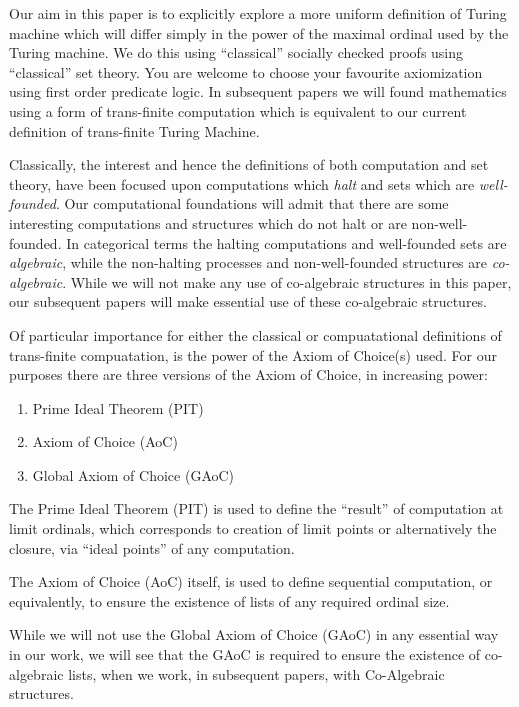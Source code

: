 \documentclass[a4paper,openany]{amsart}
\begin{document}

Our aim in this paper is to explicitly explore a more uniform definition of Turing machine
which will differ simply in the power of the maximal ordinal used by the Turing machine.
We do this using ``classical'' socially checked proofs using ``classical'' set theory. You
are welcome to choose your favourite axiomization using first order predicate logic. In
subsequent papers we will found mathematics using a form of trans-finite computation which
is equivalent to our current definition of trans-finite Turing Machine. 

Classically, the interest and hence the definitions of both computation and set theory,
have been focused upon computations which \emph{halt} and sets which are
\emph{well-founded}. Our computational foundations will admit that there are some
interesting computations and structures which do not halt or are non-well-founded. In
categorical terms the halting computations and well-founded sets are \emph{algebraic},
while the non-halting processes and non-well-founded structures are \emph{co-algebraic}. 
While we will not make any use of co-algebraic structures in this paper, our subsequent 
papers will make essential use of these co-algebraic structures.

Of particular importance for either the classical or compuatational definitions of
trans-finite compuatation, is the power of the Axiom of Choice(s) used. For our purposes
there are three versions of the Axiom of Choice, in increasing power: %
\begin{enumerate}
\item Prime Ideal Theorem (PIT)
\item Axiom of Choice (AoC)
\item Global Axiom of Choice (GAoC)
\end{enumerate}

The Prime Ideal Theorem (PIT) is used to define the ``result'' of computation at
limit ordinals, which corresponds to creation of limit points or alternatively
the closure, via ``ideal points'' of any computation.

The Axiom of Choice (AoC) itself, is used to define sequential computation, or
equivalently, to ensure the existence of lists of any required ordinal size.

While we will not use the Global Axiom of Choice (GAoC) in any essential way in
our work, we will see that the GAoC is required to ensure the existence of
co-algebraic lists, when we work, in subsequent papers, with Co-Algebraic
structures.
\end{document}
